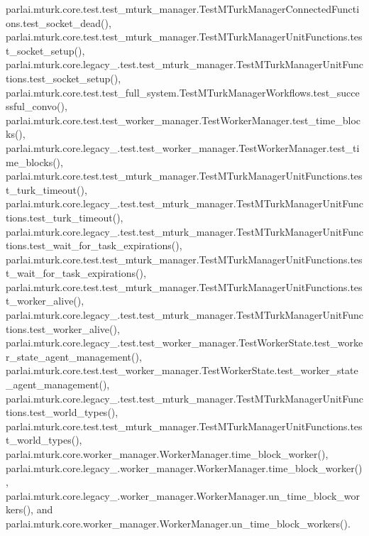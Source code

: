 parlai.\+mturk.\+core.\+test.\+test\+\_\+mturk\+\_\+manager.\+Test\+M\+Turk\+Manager\+Connected\+Functions.\+test\+\_\+socket\+\_\+dead(), parlai.\+mturk.\+core.\+test.\+test\+\_\+mturk\+\_\+manager.\+Test\+M\+Turk\+Manager\+Unit\+Functions.\+test\+\_\+socket\+\_\+setup(), parlai.\+mturk.\+core.\+legacy\+\_.\+test.\+test\+\_\+mturk\+\_\+manager.\+Test\+M\+Turk\+Manager\+Unit\+Functions.\+test\+\_\+socket\+\_\+setup(), parlai.\+mturk.\+core.\+test.\+test\+\_\+full\+\_\+system.\+Test\+M\+Turk\+Manager\+Workflows.\+test\+\_\+successful\+\_\+convo(), parlai.\+mturk.\+core.\+test.\+test\+\_\+worker\+\_\+manager.\+Test\+Worker\+Manager.\+test\+\_\+time\+\_\+blocks(), parlai.\+mturk.\+core.\+legacy\+\_.\+test.\+test\+\_\+worker\+\_\+manager.\+Test\+Worker\+Manager.\+test\+\_\+time\+\_\+blocks(), parlai.\+mturk.\+core.\+test.\+test\+\_\+mturk\+\_\+manager.\+Test\+M\+Turk\+Manager\+Unit\+Functions.\+test\+\_\+turk\+\_\+timeout(), parlai.\+mturk.\+core.\+legacy\+\_.\+test.\+test\+\_\+mturk\+\_\+manager.\+Test\+M\+Turk\+Manager\+Unit\+Functions.\+test\+\_\+turk\+\_\+timeout(), parlai.\+mturk.\+core.\+legacy\+\_.\+test.\+test\+\_\+mturk\+\_\+manager.\+Test\+M\+Turk\+Manager\+Unit\+Functions.\+test\+\_\+wait\+\_\+for\+\_\+task\+\_\+expirations(), parlai.\+mturk.\+core.\+test.\+test\+\_\+mturk\+\_\+manager.\+Test\+M\+Turk\+Manager\+Unit\+Functions.\+test\+\_\+wait\+\_\+for\+\_\+task\+\_\+expirations(), parlai.\+mturk.\+core.\+test.\+test\+\_\+mturk\+\_\+manager.\+Test\+M\+Turk\+Manager\+Unit\+Functions.\+test\+\_\+worker\+\_\+alive(), parlai.\+mturk.\+core.\+legacy\+\_.\+test.\+test\+\_\+mturk\+\_\+manager.\+Test\+M\+Turk\+Manager\+Unit\+Functions.\+test\+\_\+worker\+\_\+alive(), parlai.\+mturk.\+core.\+legacy\+\_.\+test.\+test\+\_\+worker\+\_\+manager.\+Test\+Worker\+State.\+test\+\_\+worker\+\_\+state\+\_\+agent\+\_\+management(), parlai.\+mturk.\+core.\+test.\+test\+\_\+worker\+\_\+manager.\+Test\+Worker\+State.\+test\+\_\+worker\+\_\+state\+\_\+agent\+\_\+management(), parlai.\+mturk.\+core.\+legacy\+\_.\+test.\+test\+\_\+mturk\+\_\+manager.\+Test\+M\+Turk\+Manager\+Unit\+Functions.\+test\+\_\+world\+\_\+types(), parlai.\+mturk.\+core.\+test.\+test\+\_\+mturk\+\_\+manager.\+Test\+M\+Turk\+Manager\+Unit\+Functions.\+test\+\_\+world\+\_\+types(), parlai.\+mturk.\+core.\+worker\+\_\+manager.\+Worker\+Manager.\+time\+\_\+block\+\_\+worker(), parlai.\+mturk.\+core.\+legacy\+\_.\+worker\+\_\+manager.\+Worker\+Manager.\+time\+\_\+block\+\_\+worker(), parlai.\+mturk.\+core.\+legacy\+\_.\+worker\+\_\+manager.\+Worker\+Manager.\+un\+\_\+time\+\_\+block\+\_\+workers(), and parlai.\+mturk.\+core.\+worker\+\_\+manager.\+Worker\+Manager.\+un\+\_\+time\+\_\+block\+\_\+workers().

